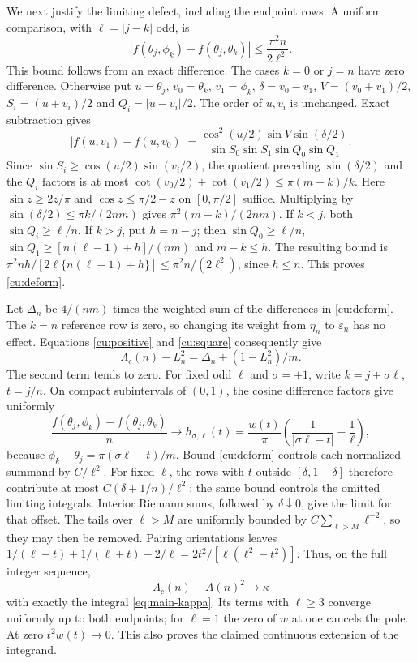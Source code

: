 We next justify the limiting defect, including the endpoint rows. A
uniform comparison, with $\ell=|j-k|$ odd, is
\begin{equation}\label{cu:deform}
 |f(\theta_j,\phi_k)-f(\theta_j,\theta_k)|
                    \leq\frac{\pi^2n}{2\ell^2}.
\end{equation}
This bound follows from an exact difference. The cases $k=0$ or $j=n$ have zero
difference. Otherwise put $u=\theta_j$, $v_0=\theta_k$, $v_1=\phi_k$,
$\delta=v_0-v_1$, $V=(v_0+v_1)/2$, $S_i=(u+v_i)/2$ and
$Q_i=|u-v_i|/2$. The order of $u,v_i$ is unchanged. Exact subtraction gives
\[
 |f(u,v_1)-f(u,v_0)|=
 \frac{\cos^2(u/2)\sin V\sin(\delta/2)}
      {\sin S_0\sin S_1\sin Q_0\sin Q_1}.
\]
Since $\sin S_i\geq\cos(u/2)\sin(v_i/2)$, the quotient preceding
$\sin(\delta/2)$ and the $Q_i$ factors is at most
$\cot(v_0/2)+\cot(v_1/2)\leq\pi(m-k)/k$.
Here $\sin z\geq2z/\pi$ and $\cos z\leq\pi/2-z$ on $[0,\pi/2]$
suffice. Multiplying by $\sin(\delta/2)\leq\pi k/(2nm)$ gives
$\pi^2(m-k)/(2nm)$. If $k<j$, both $\sin Q_i\geq\ell/n$.
If $k>j$, put $h=n-j$; then
$\sin Q_0\geq\ell/n$, $\sin Q_1\geq[n(\ell-1)+h]/(nm)$ and
$m-k\leq h$. The resulting bound is
$\pi^2nh/[2\ell\{n(\ell-1)+h\}]\leq\pi^2n/(2\ell^2)$,
since $h\leq n$. This proves \eqref{cu:deform}.

Let $\Delta_n$ be $4/(nm)$ times the weighted sum of the differences in
\eqref{cu:deform}. The $k=n$ reference row is zero, so changing its weight
from $\eta_n$ to $\varepsilon_n$ has no effect. Equations
\eqref{cu:positive} and \eqref{cu:square} consequently give
\[
 \Lambda_c(n)-L_n^2=\Delta_n+(1-L_n^2)/m.
\]
The second term tends to zero. For fixed odd $\ell$ and $\sigma=\pm1$,
write $k=j+\sigma\ell$, $t=j/n$. On compact subintervals of $(0,1)$,
the cosine difference factors give uniformly
\[
 \frac{f(\theta_j,\phi_k)-f(\theta_j,\theta_k)}n
 \longrightarrow h_{\sigma,\ell}(t)
 =\frac{w(t)}\pi\left(\frac1{|\sigma\ell-t|}-\frac1\ell\right),
\]
because $\phi_k-\theta_j=\pi(\sigma\ell-t)/m$. Bound
\eqref{cu:deform} controls each normalized summand by $C/\ell^2$.
For fixed $\ell$, the rows with $t$ outside $[\delta,1-\delta]$ therefore
contribute at most $C(\delta+1/n)/\ell^2$; the same bound controls the
omitted limiting integrals. Interior Riemann sums, followed by
$\delta\downarrow0$, give the limit for that offset. The tails over
$\ell>M$ are uniformly bounded by $C\sum_{\ell>M}\ell^{-2}$, so they
may then be removed. Pairing orientations leaves
$1/(\ell-t)+1/(\ell+t)-2/\ell=2t^2/[\ell(\ell^2-t^2)]$.
Thus, on the full integer sequence,
\begin{equation}\label{cu:kappa}
 \Lambda_c(n)-A(n)^2\longrightarrow\kappa
\end{equation}
with exactly the integral \eqref{eq:main-kappa}. Its terms with $\ell\geq3$
converge uniformly up to both endpoints; for $\ell=1$ the zero of $w$ at
one cancels the pole. At zero $t^2w(t)\to0$. This also proves the claimed
continuous extension of the integrand.

